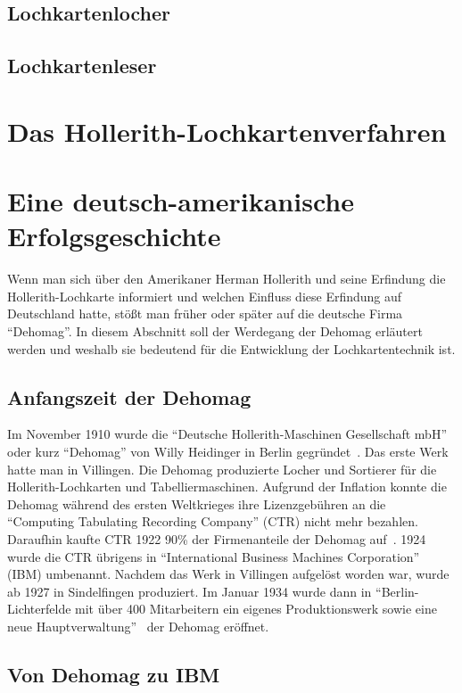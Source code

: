 \documentclass[parskip=half]{scrartcl}
\begin{document}
\subsection{Lochkartenlocher}
\subsection{Lochkartenleser}

\section{Das Hollerith-Lochkartenverfahren}

\section{Eine deutsch-amerikanische Erfolgsgeschichte}

Wenn man sich über den Amerikaner Herman Hollerith und seine Erfindung die Hollerith-Lochkarte informiert und welchen Einfluss diese Erfindung auf Deutschland hatte, stößt man früher oder später auf die deutsche Firma \enquote{Dehomag}. In diesem Abschnitt soll der Werdegang der Dehomag erläutert werden und weshalb sie bedeutend  für die Entwicklung der Lochkartentechnik ist.

\subsection{Anfangszeit der Dehomag}

Im November 1910 wurde die \enquote{Deutsche Hollerith-Maschinen Gesellschaft mbH} oder kurz \enquote{Dehomag} von Willy Heidinger in Berlin gegründet~\cite{dingwerth}. Das erste Werk hatte man in Villingen. Die Dehomag produzierte Locher und Sortierer für die Hollerith-Lochkarten und Tabelliermaschinen. Aufgrund der Inflation konnte die Dehomag während des ersten Weltkrieges ihre Lizenzgebühren an die \enquote{Computing Tabulating Recording Company} (CTR) nicht mehr bezahlen. Daraufhin kaufte CTR 1922 90\% der Firmenanteile der Dehomag auf~\cite{restloseErfassung}. 1924 wurde die CTR übrigens in \enquote{International Business Machines Corporation} (IBM) umbenannt. Nachdem das Werk in Villingen aufgelöst worden war, wurde ab 1927 in Sindelfingen produziert. Im Januar 1934 wurde dann in \enquote{Berlin-Lichterfelde mit über 400 Mitarbeitern ein eigenes Produktionswerk sowie eine neue Hauptverwaltung}~\cite{dingwerth} der Dehomag eröffnet.

\subsection{Von Dehomag zu IBM}
\end{document}

